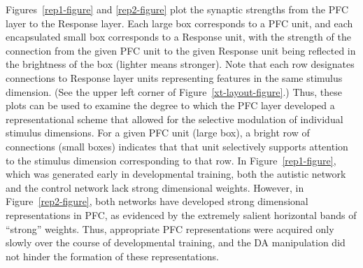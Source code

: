 Figures~\ref{rep1-figure} and \ref{rep2-figure} plot the synaptic
strengths from the PFC layer to the Response layer.  Each large box
corresponds to a PFC unit, and each encapsulated small box corresponds
to a Response unit, with the strength of the connection from the given
PFC unit to the given Response unit being reflected in the brightness
of the box (lighter means stronger).  Note that each row designates
connections to Response layer units representing features in the same
stimulus dimension.  (See the upper left corner of
Figure~\ref{xt-layout-figure}.)  Thus, these plots can be used to
examine the degree to which the PFC layer developed a representational scheme that allowed for the selective modulation of individual stimulus dimensions.  For a given PFC unit (large box), a bright row of connections (small boxes) indicates that that unit selectively supports attention to the stimulus dimension corresponding to that row.  In
Figure~\ref{rep1-figure}, which was generated early in developmental
training, both the autistic network and the control network lack
strong dimensional weights.  However, in Figure~\ref{rep2-figure},
both networks have developed strong dimensional representations in
PFC, as evidenced by the extremely salient horizontal bands of
``strong'' weights.  Thus, appropriate PFC representations were
acquired only slowly over the course of developmental training, and
the DA manipulation did not hinder the formation of these
representations.

